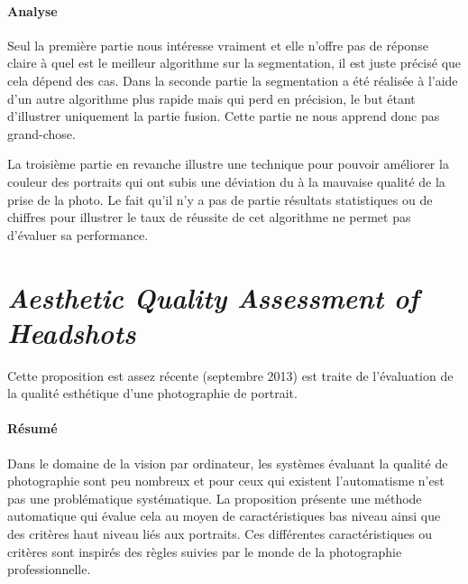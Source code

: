 \documentclass[11pt, french]{report-rd-info}
\begin{document}
\paragraph{Analyse}
Seul la première partie nous intéresse vraiment et elle n'offre pas de réponse claire à quel est le meilleur algorithme sur la segmentation, il est juste précisé que cela dépend des cas.
Dans la seconde partie la segmentation a été réalisée à l'aide d'un autre algorithme plus rapide mais qui perd en précision, le but étant d'illustrer uniquement la partie fusion. Cette partie ne nous apprend donc pas grand-chose.

La troisième partie en revanche illustre une technique pour pouvoir améliorer la couleur des portraits qui ont subis une déviation du à la mauvaise qualité de la prise de la photo.
Le fait qu'il n'y a pas de partie résultats statistiques ou de chiffres pour illustrer le taux de réussite de cet algorithme ne permet pas d'évaluer sa performance.

\section{\emph{Aesthetic Quality Assessment of Headshots}}
Cette proposition \cite{Males2013} est assez récente (septembre 2013) est traite de l’évaluation de la qualité esthétique d’une photographie de portrait.

\paragraph{Résumé}
Dans le domaine de la vision par ordinateur, les systèmes évaluant la qualité de photographie sont peu nombreux et pour ceux qui existent l’automatisme n’est pas une problématique systématique. La proposition présente une méthode automatique qui évalue cela au moyen de caractéristiques bas niveau ainsi que des critères haut niveau liés aux portraits. Ces différentes caractéristiques ou critères sont inspirés des règles suivies par le monde de la photographie professionnelle.
\end{document}
